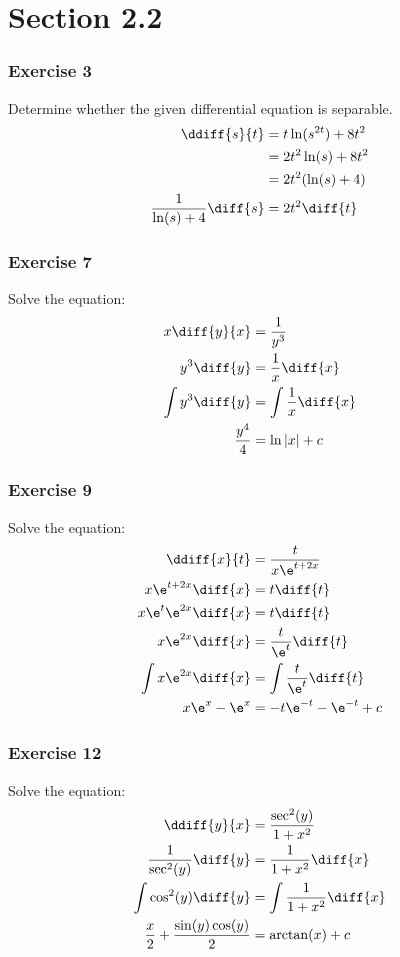 \documentclass{math}
\begin{document}
\section*{Section 2.2}

\subsubsection*{Exercise 3}
Determine whether the given differential equation is separable.
\begin{align*}
  \ddiff{s}{t} &= t\ln(s^{2t})+8t^2 \\
  &= 2t^2\ln(s)+8t^2 \\
  &= 2t^2(\ln(s)+4) \\
  \frac{1}{\ln(s)+4}\diff{s} &= 2t^2\diff{t}
\end{align*}

\subsubsection*{Exercise 7}
Solve the equation:
\begin{align*}
  x\diff{y}{x} &= \frac{1}{y^3} \\
  y^3\diff{y} &= \frac{1}{x}\diff{x} \\
  \int y^3\diff{y} &= \int\frac{1}{x}\diff{x} \\
  \frac{y^4}{4} &= \ln|x|+c
\end{align*}

\subsubsection*{Exercise 9}
Solve the equation:
\begin{align*}
  \ddiff{x}{t} &= \frac{t}{x\e^{t+2x}} \\
  x\e^{t+2x}\diff{x} &= t\diff{t} \\
  x\e^t\e^{2x}\diff{x} &= t\diff{t} \\
  x\e^{2x}\diff{x} &= \frac{t}{\e^t}\diff{t} \\
  \int x\e^{2x}\diff{x} &= \int\frac{t}{\e^t}\diff{t} \\
  x\e^x-\e^x &= -t\e^{-t}-\e^{-t}+c
\end{align*}

\subsubsection*{Exercise 12}
Solve the equation:
\begin{align*}
  \ddiff{y}{x} &= \frac{\sec^2(y)}{1+x^2} \\
  \frac{1}{\sec^2(y)}\diff{y} &= \frac{1}{1+x^2}\diff{x} \\
  \int\cos^2(y)\diff{y} &= \int\frac{1}{1+x^2}\diff{x} \\
  \frac{x}{2}+\frac{\sin(y)\cos(y)}{2} &= \arctan(x)+c
\end{align*}
\end{document}
